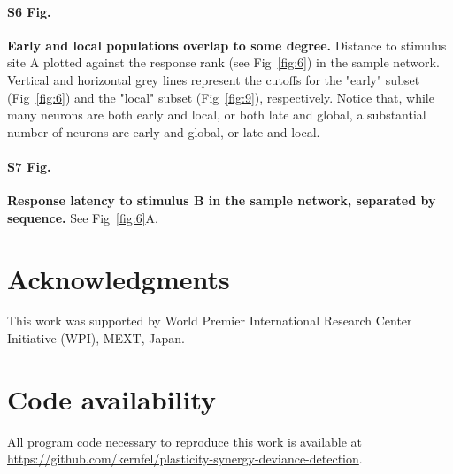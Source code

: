 \documentclass[10pt,letterpaper]{article}
\newcommand{\FIG}[1]{Fig~\ref{fig:#1}}
\begin{document}
\paragraph*{S6 Fig.}
\label{S6_Fig}
\textbf{Early and local populations overlap to some degree.}
Distance to stimulus site A plotted against the response rank (see \FIG{6}) in the sample network. Vertical and horizontal grey lines represent the cutoffs for the "early" subset (\FIG{6}) and the "local" subset (\FIG{9}), respectively. Notice that, while many neurons are both early and local, or both late and global, a substantial number of neurons are early and global, or late and local.

\paragraph*{S7 Fig.}
\label{S7_Fig}
\textbf{Response latency to stimulus B in the sample network, separated by sequence.}
See \FIG{6}A.

\section*{Acknowledgments}
This work was supported by World Premier International Research Center Initiative (WPI), MEXT, Japan.

\section*{Code availability}

All program code necessary to reproduce this work is available at \url{https://github.com/kernfel/plasticity-synergy-deviance-detection}.

\nolinenumbers
\end{document}
